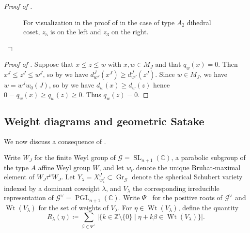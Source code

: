 \documentclass[11pt]{amsart}
\theoremstyle{definition}
\theoremstyle{remark}
\numberwithin{equation}{section}
\newcommand{\Z}{\mathbb Z}
\newcommand{\C}{\mathbb C}
\begin{document}
\begin{proof}[Proof of ]
\begin{figure}[h!]
\caption{For visualization in the proof of  in the case of type $A_2$ dihedral coset, $z_5$ is on the left and $z_3$ on the right.}
\label{fig:degree-monotone-A2}
\end{figure}
\end{proof}

\begin{proof}[Proof of ]
Suppose that $x \leq z \leq w$ with $x,w \in M_J$ and that $q_w(x)=0$. Then $x^J \leq z^J \leq w^J$, so by  we have $d^J_{w^J}(x^J) \geq d^J_{w^J}(z^J)$. Since $w\in M_J$, we have $w=w^Jw_0(J)$, so by  we have $d_w(x) \geq d_w(z)$ hence $0=q_w(x) \geq q_w(z) \geq 0$. Thus $q_w(z)=0$.
\end{proof}

\subsection{Weight diagrams and geometric Satake}
We now discuss a consequence of .

Write $W_J$ for the finite Weyl group of $\mathcal{G}=\operatorname{SL}_{n+1}(\C)$, a parabolic subgroup of the type $A$ affine Weyl group $W$, and let $w_\nu$ denote the unique Bruhat-maximal element of $W_J\tau^\nu W_J$. Let $Y_\lambda = X^J_{w_\lambda^J} \subset \operatorname{Gr}_{\mathcal{G}}$ denote the spherical Schubert variety indexed by a dominant coweight $\lambda$, and $V_\lambda$ the corresponding irreducible representation of $\mathcal{G}^\vee=\operatorname{PGL}_{n+1}(\C)$.
Write $\Psi^+$ for the positive roots of $\mathcal{G}^\vee$ and
$\operatorname{Wt}(V_\lambda)$ for the set of weights of $V_\lambda$. For
$\eta\in\operatorname{Wt}(V_\lambda)$, define the quantity
\[
 R_\lambda(\eta)\coloneqq
 \sum_{\beta\in\Psi^+}
 \lvert\{k\in\Z\setminus\{0\} \mid
            \eta+k\beta\in\operatorname{Wt}(V_\lambda)\}\rvert.
\]
\end{document}
